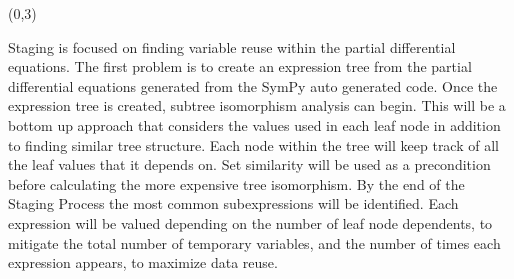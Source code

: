 \documentclass[landscape]{a0poster}
\def\Subhead#1{\noindent{\textbf{\Large\color{DarkBlue} #1}}\medskip}
\begin{document}
\begin{textblock}{30}
\begin{textblock}{14}
	
\end{textblock}


\begin{textblock}{14}(0,3)
	\Subhead{Staging}

	\vspace{-0.25in}
	Staging is focused on finding variable reuse within the partial differential equations. The first problem is to create an expression tree from the partial differential equations generated from the SymPy auto generated code. 
	Once the expression tree is created, subtree isomorphism analysis can begin. This will be a bottom up approach that considers the values used in each leaf node in addition to finding similar tree structure. Each node within the tree will keep track of all the leaf values that it depends on. Set similarity will be used as a precondition before calculating the more expensive tree isomorphism. By the end of the Staging Process the most common subexpressions will be identified. Each expression will be valued depending on the number of leaf node dependents, to mitigate the total number of temporary variables, and the number of times each expression appears, to maximize data reuse.

	
\end{textblock}

\end{textblock}
\end{document}
